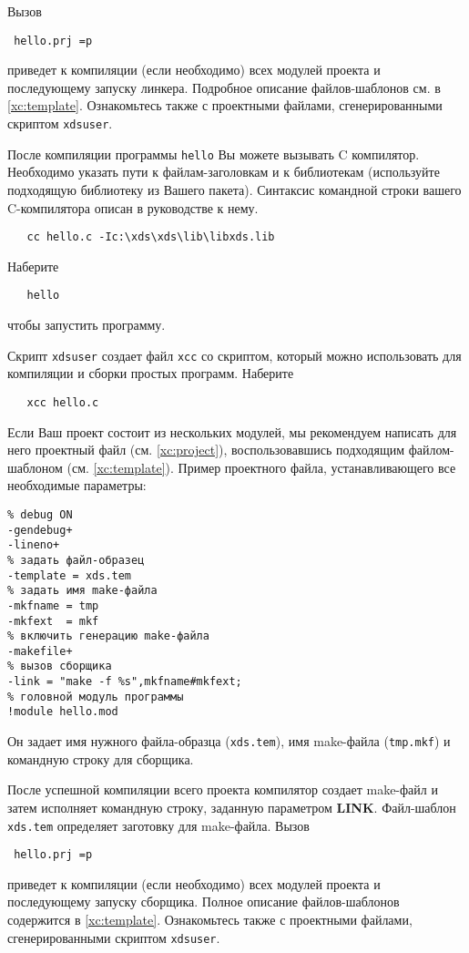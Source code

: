 Вызов 
\begin{flushleft} \tt
        \xc{} hello.prj =p
\end{flushleft}
приведет к компиляции (если необходимо) всех модулей проекта и 
последующему запуску линкера.
\fi
Подробное описание файлов-шаблонов см. в \ref{xc:template}.
Ознакомьтесь также с проектными файлами, сгенерированными скриптом
{\tt xdsuser}.

\fi %

\ifgenc %

 После компиляции программы {\tt hello} Вы можете вызывать 
 C компилятор.
 Необходимо указать пути к файлам-заголовкам и к библиотекам
 (используйте подходящую библиотеку из Вашего пакета).
 Синтаксис командной строки вашего C-компилятора описан в руководстве
 к нему.
 \begin{verbatim}
   cc hello.c -Ic:\xds\xds\lib\libxds.lib
 \end{verbatim}
 Наберите
 \begin{verbatim}
   hello
 \end{verbatim}
 чтобы запустить программу.

 Скрипт {\tt xdsuser} создает файл {\tt xcc} со скриптом, который
 можно использовать для компиляции и сборки простых программ.
 Наберите
 \begin{verbatim}
   xcc hello.c
 \end{verbatim}
Если Ваш проект состоит из нескольких модулей, мы рекомендуем 
написать для него проектный файл
(см. \ref{xc:project}), воспользовавшись подходящим файлом-шаблоном
(см. \ref{xc:template}).
Пример проектного файла, устанавливающего все необходимые параметры:
\begin{verbatim}
% debug ON
-gendebug+
-lineno+
% задать файл-образец
-template = xds.tem
% задать имя make-файла
-mkfname = tmp
-mkfext  = mkf
% включить генерацию make-файла
-makefile+
% вызов сборщика
-link = "make -f %s",mkfname#mkfext;
% головной модуль программы
!module hello.mod
\end{verbatim}
Он задает имя нужного файла-образца ({\tt xds.tem}), 
имя make-файла ({\tt tmp.mkf}) 
и командную строку для сборщика.

После успешной компиляции всего проекта компилятор создает
make-файл и затем исполняет командную строку, заданную параметром
{\bf LINK}.
Файл-шаблон {\tt xds.tem} определяет заготовку для make-файла.
Вызов
\begin{flushleft} \tt
        \xc{} hello.prj =p
\end{flushleft}
приведет к компиляции (если необходимо) всех модулей проекта и 
последующему запуску сборщика.
Полное описание файлов-шаблонов содержится в \ref{xc:template}.
Ознакомьтесь также с проектными файлами, сгенерированными скриптом
{\tt xdsuser}.

